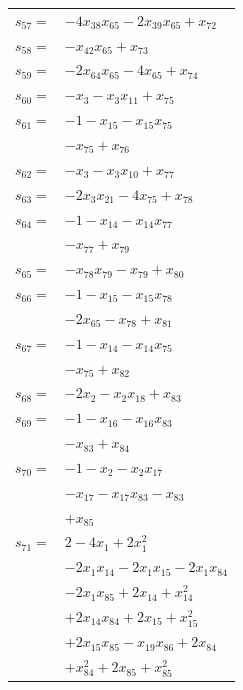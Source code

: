 \begin{longtable}{@{}r@{\;}l@{}}
\(s_{57}=\) & \(\displaystyle -4x_{38}x_{65} -2x_{39}x_{65} +x_{72}\) \\[3pt]
\(s_{58}=\) & \(\displaystyle -x_{42}x_{65} +x_{73}\) \\[3pt]
\(s_{59}=\) & \(\displaystyle -2x_{64}x_{65} -4x_{65} +x_{74}\) \\[3pt]
\(s_{60}=\) & \(\displaystyle -x_{3} -x_{3}x_{11} +x_{75}\) \\[3pt]
\(s_{61}=\) & \(\displaystyle -1 -x_{15} -x_{15}x_{75}\) \\
 & \(\displaystyle -x_{75} +x_{76}\) \\[3pt]
\(s_{62}=\) & \(\displaystyle -x_{3} -x_{3}x_{10} +x_{77}\) \\[3pt]
\(s_{63}=\) & \(\displaystyle -2x_{3}x_{21} -4x_{75} +x_{78}\) \\[3pt]
\(s_{64}=\) & \(\displaystyle -1 -x_{14} -x_{14}x_{77}\) \\
 & \(\displaystyle -x_{77} +x_{79}\) \\[3pt]
\(s_{65}=\) & \(\displaystyle -x_{78}x_{79} -x_{79} +x_{80}\) \\[3pt]
\(s_{66}=\) & \(\displaystyle -1 -x_{15} -x_{15}x_{78}\) \\
 & \(\displaystyle -2x_{65} -x_{78} +x_{81}\) \\[3pt]
\(s_{67}=\) & \(\displaystyle -1 -x_{14} -x_{14}x_{75}\) \\
 & \(\displaystyle -x_{75} +x_{82}\) \\[3pt]
\(s_{68}=\) & \(\displaystyle -2x_{2} -x_{2}x_{18} +x_{83}\) \\[3pt]
\(s_{69}=\) & \(\displaystyle -1 -x_{16} -x_{16}x_{83}\) \\
 & \(\displaystyle -x_{83} +x_{84}\) \\[3pt]
\(s_{70}=\) & \(\displaystyle -1 -x_{2} -x_{2}x_{17}\) \\
 & \(\displaystyle -x_{17} -x_{17}x_{83} -x_{83}\) \\
 & \(\displaystyle +x_{85}\) \\[3pt]
\(s_{71}=\) & \(\displaystyle 2 -4x_{1} +2x_{1}^{2}\) \\
 & \(\displaystyle -2x_{1}x_{14} -2x_{1}x_{15} -2x_{1}x_{84}\) \\
 & \(\displaystyle -2x_{1}x_{85} +2x_{14} +x_{14}^{2}\) \\
 & \(\displaystyle +2x_{14}x_{84} +2x_{15} +x_{15}^{2}\) \\
 & \(\displaystyle +2x_{15}x_{85} -x_{19}x_{86} +2x_{84}\) \\
 & \(\displaystyle +x_{84}^{2} +2x_{85} +x_{85}^{2}\) \\

\end{longtable}
